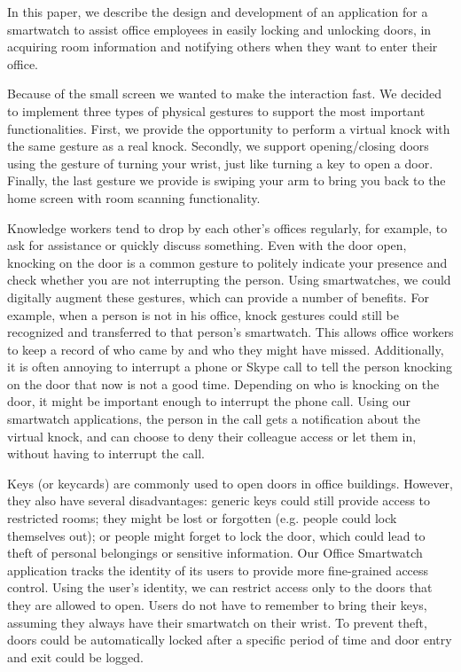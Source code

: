 \documentclass{article}
\begin{document}
In this paper, we describe the
design and development of an application for a
smartwatch to assist office employees in easily locking
and unlocking doors, in acquiring room information and
notifying others when they want to enter their office. 

 Because of the
small screen we wanted to make the interaction fast.
We decided to implement three types of physical
gestures to support the most important functionalities.
First, we provide the opportunity to perform a virtual
knock with the same gesture as a real knock. Secondly,
we support opening/closing doors using the gesture of
turning your wrist, just like turning a key to open a
door. Finally, the last gesture we provide is swiping
your arm to bring you back to the home screen with
room scanning functionality.

Knowledge workers tend to drop by each other’s offices
regularly, for example, to ask for assistance or quickly
discuss something. Even with the door open, knocking
on the door is a common gesture to politely indicate
your presence and check whether you are not
interrupting the person. Using smartwatches, we could
digitally augment these gestures, which can provide a
number of benefits. For example, when a person is not
in his office, knock gestures could still be recognized
and transferred to that person’s smartwatch. This
allows office workers to keep a record of who came by
and who they might have missed. Additionally, it is
often annoying to interrupt a phone or Skype call to tell
the person knocking on the door that now is not a good
time. Depending on who is knocking on the door, it
might be important enough to interrupt the phone call.
Using our smartwatch applications, the person in the
call gets a notification about the virtual knock, and can
choose to deny their colleague access or let them in,
without having to interrupt the call. 

Keys (or keycards) are commonly used to open doors in
office buildings. However, they also have several
disadvantages: generic keys could still provide access
to restricted rooms; they might be lost or forgotten
(e.g. people could lock themselves out); or people
might forget to lock the door, which could lead to theft
of personal belongings or sensitive information. Our
Office Smartwatch application tracks the identity of its
users to provide more fine-grained access control.
Using the user’s identity, we can restrict access only to
the doors that they are allowed to open. Users do not
have to remember to bring their keys, assuming they
always have their smartwatch on their wrist. To prevent
theft, doors could be automatically locked after a
specific period of time and door entry and exit could be
logged.
\end{document}
